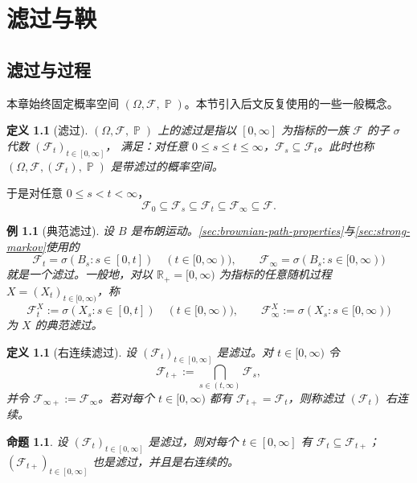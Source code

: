 \documentclass[UTF8,11pt,a4paper,oneside,fontset=fandol]{ctexrep}
\numberwithin{equation}{section}
\theoremstyle{zhthm}
\newtheorem{proposition}[theorem]{命题}
\newtheorem{definition}[theorem]{定义}
\newtheorem{example}[theorem]{例}
\newcommand{\R}{\mathbb{R}}
\newcommand{\F}{\mathcal{F}}
\DeclareMathOperator{\Prob}{\mathbb{P}}
\begin{document}
\chapter{滤过与鞅}
\label{chap:filtrations-martingales}

\section{滤过与过程}
\label{sec:filtrations-processes}

本章始终固定概率空间 $(\Omega,\F,\Prob)$。本节引入后文反复使用的一些一般概念。

\begin{definition}[滤过]
\label{def:filtration}
$(\Omega,\F,\Prob)$ 上的滤过是指以 $[0,\infty]$ 为指标的一族 $\F$ 的子 $\sigma$ 代数 $(\F_t)_{t\in[0,\infty]}$，
满足：对任意 $0\le s\le t\le\infty$，$\F_s\subseteq\F_t$。此时也称 $(\Omega,\F,(\F_t),\Prob)$ 是带滤过的概率空间。
\end{definition}

于是对任意 $0\le s<t<\infty$，
\[
  \F_0\subseteq\F_s\subseteq\F_t\subseteq\F_\infty\subseteq\F.
\]

\begin{example}[典范滤过]
\label{ex:canonical-filtration}
设 $B$ 是布朗运动。\cref{sec:brownian-path-properties}与\cref{sec:strong-markov}使用的
\[
  \F_t=\sigma(B_s:s\in[0,t])\quad(t\in[0,\infty)),\qquad \F_\infty=\sigma(B_s:s\in[0,\infty))
\]
就是一个滤过。一般地，对以 $\R_+=[0,\infty)$ 为指标的任意随机过程 $X=(X_t)_{t\in[0,\infty)}$，称
\[
  \F^X_t:=\sigma(X_s:s\in[0,t])\quad(t\in[0,\infty)),\qquad \F^X_\infty:=\sigma(X_s:s\in[0,\infty))
\]
为 $X$ 的典范滤过。
\end{example}

\begin{definition}[右连续滤过]
\label{def:right-continuous-filtration}
设 $(\F_t)_{t\in[0,\infty]}$ 是滤过。对 $t\in[0,\infty)$ 令
\[
  \F_{t+}:=\bigcap_{s\in(t,\infty)}\F_s,
\]
并令 $\F_{\infty+}:=\F_\infty$。若对每个 $t\in[0,\infty)$ 都有 $\F_{t+}=\F_t$，则称滤过 $(\F_t)$ 右连续。
\end{definition}

\begin{proposition}
\label{prop:right-continuous-regularization}
设 $(\F_t)_{t\in[0,\infty]}$ 是滤过，则对每个 $t\in[0,\infty]$ 有 $\F_t\subseteq\F_{t+}$；
$(\F_{t+})_{t\in[0,\infty]}$ 也是滤过，并且是右连续的。
\end{proposition}
\end{document}
